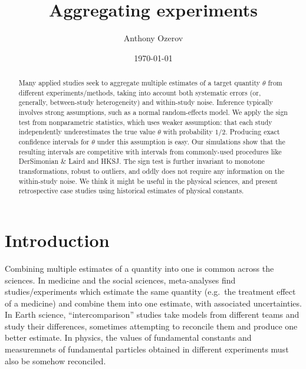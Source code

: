 \documentclass[12pt]{article}
\title{Aggregating experiments}
\author{Anthony Ozerov}
\date{\today}
\begin{document}
\maketitle

\begin{abstract}
Many applied studies seek to aggregate multiple estimates of a target quantity $\theta$ from different experiments/methods, taking into account both systematic errors (or, generally, between-study heterogeneity) and within-study noise. Inference typically involves strong assumptions, such as a normal random-effects model. We apply the sign test from nonparametric statistics, which uses weaker assumption: that each study independently underestimates the true value $\theta$ with probability $1/2$. Producing exact confidence intervals for $\theta$ under this assumption is easy. Our simulations show that the resulting intervals are competitive with intervals from commonly-used procedures like DerSimonian \& Laird and HKSJ. The sign test is further invariant to monotone transformations, robust to outliers, and oddly does not require any information on the within-study noise. We think it might be useful in the physical sciences, and present retrospective case studies using historical estimates of physical constants.
\end{abstract}

\newpage

\tableofcontents

\newpage

\section{Introduction}\label{introduction}

Combining multiple estimates of a quantity into one is common across the sciences. In medicine and the social sciences, meta-analyses find studies/experiments which estimate the same quantity (e.g.~the treatment effect of a medicine) and combine them into one estimate, with associated uncertainties. In Earth science, ``intercomparison'' studies take models from different teams and study their differences, sometimes attempting to reconcile them and produce one better estimate. In physics, the values of fundamental constants and measuremnets of fundamental particles obtained in different experiments must also be somehow reconciled.
\end{document}
